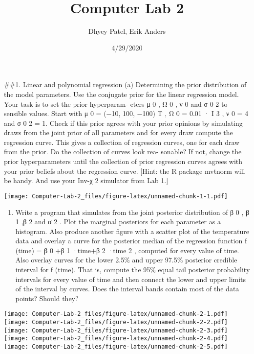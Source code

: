 \documentclass[]{article}
\title{Computer Lab 2}
\author{Dhyey Patel, Erik Anders}
\date{4/29/2020}
\providecommand{\tightlist}{%
  \setlength{\itemsep}{0pt}\setlength{\parskip}{0pt}}
\begin{document}
\maketitle

\#\#1. Linear and polynomial regression (a) Determining the prior
distribution of the model parameters. Use the conjugate prior for the
linear regression model. Your task is to set the prior hyperparam- eters
μ 0 , Ω 0 , ν 0 and σ 0 2 to sensible values. Start with μ 0 = (−10,
100, −100) T , Ω 0 = 0.01 · I 3 , ν 0 = 4 and σ 0 2 = 1. Check if this
prior agrees with your prior opinions by simulating draws from the joint
prior of all parameters and for every draw compute the regression curve.
This gives a collection of regression curves, one for each draw from the
prior. Do the collection of curves look rea- sonable? If not, change the
prior hyperparameters until the collection of prior regression curves
agrees with your prior beliefs about the regression curve. {[}Hint: the
R package mvtnorm will be handy. And use your Inv-χ 2 simulator from Lab
1.{]}

\texttt{[image: Computer-Lab-2\_files/figure-latex/unnamed-chunk-1-1.pdf]}

\begin{enumerate}
\def\labelenumi{(\alph{enumi})}
\setcounter{enumi}{1}
\tightlist
\item
  Write a program that simulates from the joint posterior distribution
  of β 0 , β 1 ,β 2 and σ 2 . Plot the marginal posteriors for each
  parameter as a histogram. Also produce another figure with a scatter
  plot of the temperature data and overlay a curve for the posterior
  median of the regression function f (time) = β 0 +β 1 ·time+β 2 ·time
  2 , computed for every value of time. Also overlay curves for the
  lower 2.5\% and upper 97.5\% posterior credible interval for f (time).
  That is, compute the 95\% equal tail posterior probability intervals
  for every value of time and then connect the lower and upper limits of
  the interval by curves. Does the interval bands contain most of the
  data points? Should they?
\end{enumerate}

\texttt{[image: Computer-Lab-2\_files/figure-latex/unnamed-chunk-2-1.pdf]}
\texttt{[image: Computer-Lab-2\_files/figure-latex/unnamed-chunk-2-2.pdf]}
\texttt{[image: Computer-Lab-2\_files/figure-latex/unnamed-chunk-2-3.pdf]}
\texttt{[image: Computer-Lab-2\_files/figure-latex/unnamed-chunk-2-4.pdf]}
\texttt{[image: Computer-Lab-2\_files/figure-latex/unnamed-chunk-2-5.pdf]}
\end{document}
